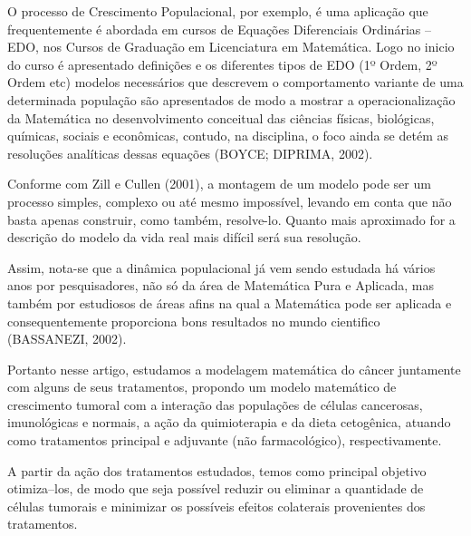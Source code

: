 O processo de Crescimento Populacional, por exemplo, é uma aplicação que frequentemente é abordada em cursos de Equações Diferenciais Ordinárias -- EDO, nos Cursos de Graduação em Licenciatura em Matemática. Logo no inicio do curso é apresentado definições e os diferentes tipos de EDO (1º Ordem, 2º Ordem  etc) modelos necessários que descrevem o comportamento variante de uma determinada população são apresentados de modo a mostrar a operacionalização da Matemática no desenvolvimento conceitual das ciências físicas, biológicas, químicas, sociais e econômicas, contudo, na disciplina, o foco ainda se detém as resoluções analíticas dessas equações (BOYCE; DIPRIMA, 2002).

Conforme com Zill e Cullen (2001), a montagem de um modelo pode ser um processo simples, complexo ou até mesmo impossível, levando em conta que não basta apenas construir, como também, resolve-lo. Quanto mais aproximado for a descrição do modelo da vida real mais difícil será sua resolução. 

Assim, nota-se que a dinâmica populacional já vem sendo estudada há vários anos por pesquisadores, não só da área de Matemática Pura e Aplicada, mas também por estudiosos de áreas afins na qual a Matemática pode ser aplicada e consequentemente proporciona bons resultados no mundo cientifico (BASSANEZI, 2002).

Portanto nesse artigo, estudamos a modelagem matemática do câncer juntamente com alguns de seus tratamentos, propondo um modelo matemático de crescimento tumoral com a interação das populações de células cancerosas, imunológicas e normais, a ação da quimioterapia e da dieta cetogênica, atuando como tratamentos principal e adjuvante (não farmacológico), respectivamente.

A partir da ação dos tratamentos estudados, temos como principal objetivo otimiza--los, de modo que seja possível reduzir ou eliminar a quantidade de células tumorais e minimizar os possíveis efeitos colaterais provenientes dos tratamentos. 
